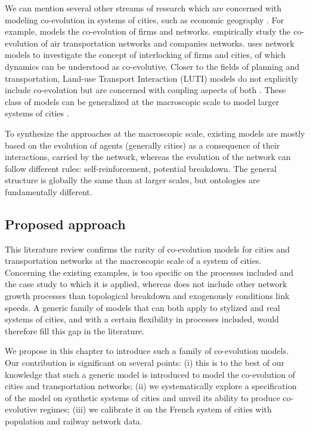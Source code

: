 \documentclass[11pt]{article}
\begin{document}
We can mention several other streams of research which are concerned with modeling co-evolution in systems of cities, such as economic geography \citep{schamp201020}. For example, \cite{doi:10.1080/00343400802662658} models the co-evolution of firms and networks. \cite{liu2013exploring} empirically study the co-evolution of air transportation networks and companies networks. \cite{neal2012structural} uses network models to investigate the concept of interlocking of firms and cities, of which dynamics can be understood as co-evolutive. Closer to the fields of planning and transportation, Land-use Transport Interaction (LUTI) models do not explicitly include co-evolution but are concerned with coupling aspects of both \citep{wegener2004land}. These class of models can be generalized at the macroscopic scale to model larger systems of cities \citep{russo2012unifying}.


To synthesize the approaches at the macroscopic scale, existing models are mostly based on the evolution of agents (generally cities) as a consequence of their interactions, carried by the network, whereas the evolution of the network can follow different rules: self-reinforcement, potential breakdown. The general structure is globally the same than at larger scales, but ontologies are fundamentally different.



\subsection{Proposed approach}

This literature review confirms the rarity of co-evolution models for cities and transportation networks at the macroscopic scale of a system of cities. Concerning the existing examples, \cite{baptistemodeling} is too specific on the processes included and the case study to which it is applied, whereas \cite{schmitt2014modelisation} does not include other network growth processes than topological breakdown and exogenously conditions link speeds. A generic family of models that can both apply to stylized and real systems of cities, and with a certain flexibility in processes included, would therefore fill this gap in the literature.

We propose in this chapter to introduce such a family of co-evolution models. Our contribution is significant on several points: (i) this is to the best of our knowledge that such a generic model is introduced to model the co-evolution of cities and transportation networks; (ii) we systematically explore a specification of the model on synthetic systems of cities and unveil its ability to produce co-evolutive regimes; (iii) we calibrate it on the French system of cities with population and railway network data.
\end{document}
